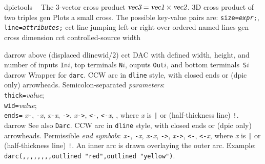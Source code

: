 %
  {dpictools}%
  {$\;\;$ The 3-vector cross product
    $\hbox{\sl vec3} = \hbox{\sl vec1} \times \hbox{\sl vec2}$.}%
%
  {3D}%
  {cross product of two triples}%
%
  {gen}%
  {Plots a small cross.  The possible key-value pairs are:
    {\tt size={\sl expr};},
    {\tt line={\sl attributes};} }%
%
  {cct}%
  {line jumping left or right over ordered named
   lines}%
%
  {gen}%
  {cross dimension}%
%
  {cct}%
  {controlled-source width}%

%
%
  {darrow}%
  {above (displaced dlinewid/2)}%
%
  {cct}%
  {DAC with defined width, height, and number of inputs {\tt In$i$},
    top terminals {\tt N$i$}, ouputs {\tt Out$i$},
    and bottom terminals~{\tt S$i$} }%
%
  {darrow}%
  {Wrapper for {\tt darc}.
   CCW arc in {\tt dline} style, with closed ends or (dpic only) arrowheads.
  Semicolon-separated {\sl parameters}:\\
  {\tt thick=}{\sl value};\\
  {\tt wid=}{\sl value};\\
  {\tt ends=} {\sl x}{\tt -},
  {\tt -}{\sl x}, {\sl x}{\tt -}{\sl x}, {\tt ->}, {\sl x}{\tt ->},
  {\tt <-}, {\tt <-}{\sl x}, {\tt <->},
  where {\sl x} is {\tt |} or (half-thickness line) {\tt !}.}%
%
  {darrow}%
  {See also {\tt Darc}.
   CCW arc in {\tt dline} style, with closed ends or (dpic only) arrowheads.
  Permissible {\sl end symbols}:
  {\sl x}{\tt -},
  {\tt -}{\sl x}, {\sl x}{\tt -}{\sl x}, {\tt ->}, {\sl x}{\tt ->},
  {\tt <-}, {\tt <-}{\sl x}, {\tt <->}
  where {\sl x} is {\tt |} or (half-thickness line) {\tt !}.
  An inner arc is drawn overlaying the outer arc.
  Example: {\tt darc(,{,},{,},{,},{,}outlined "red",outlined "yellow")}.}%
%
